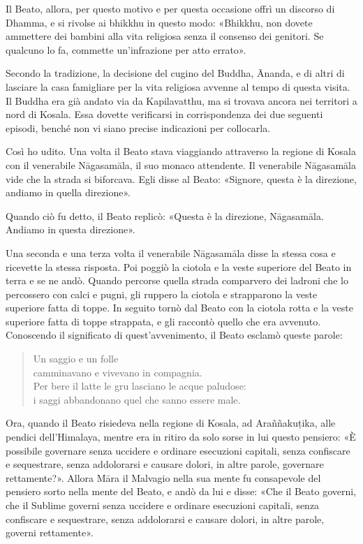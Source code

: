 Il Beato, allora, per questo motivo e per questa occasione offrì un discorso di
Dhamma, e si rivolse ai bhikkhu in questo modo: «Bhikkhu, non dovete ammettere
dei bambini alla vita religiosa senza il consenso dei genitori. Se qualcuno lo
fa, commette un’infrazione per atto errato».


 Secondo la tradizione, la decisione del cugino del
Buddha, Ānanda, e di altri di lasciare la casa famigliare per la vita religiosa
avvenne al tempo di questa visita. Il Buddha era già andato via da Kapilavatthu,
ma si trovava ancora nei territori a nord di Kosala. Essa dovette verificarsi in
corrispondenza dei due seguenti episodi, benché non vi siano precise indicazioni
per collocarla.

 Così ho udito. Una volta il Beato stava viaggiando
attraverso la regione di Kosala con il venerabile Nāgasamāla, il suo monaco
attendente. Il venerabile Nāgasamāla vide che la strada si biforcava. Egli disse
al Beato: «Signore, questa è la direzione, andiamo in quella direzione».

Quando ciò fu detto, il Beato replicò: «Questa è la direzione, Nāgasamāla.
Andiamo in questa direzione».

Una seconda e una terza volta il venerabile Nāgasamāla disse la stessa cosa e
ricevette la stessa risposta. Poi poggiò la ciotola e la veste superiore del
Beato in terra e se ne andò. Quando percorse quella strada comparvero dei
ladroni che lo percossero con calci e pugni, gli ruppero la ciotola e
strapparono la veste superiore fatta di toppe. In seguito tornò dal Beato con la
ciotola rotta e la veste superiore fatta di toppe strappata, e gli raccontò
quello che era avvenuto. Conoscendo il significato di quest’avvenimento, il
Beato esclamò queste parole:

\begin{quote}
Un saggio e un folle \\
camminavano e vivevano in compagnia. \\
Per bere il latte le gru lasciano le acque paludose: \\
i saggi abbandonano quel che sanno essere male.
\end{quote}


Ora, quando il Beato risiedeva nella regione di Kosala, ad Araññakuṭika, alle
pendici dell’Himalaya, mentre era in ritiro da solo sorse in lui questo
pensiero: «È possibile governare senza uccidere e ordinare esecuzioni capitali,
senza confiscare e sequestrare, senza addolorarsi e causare dolori, in altre
parole, governare rettamente?». Allora Māra il Malvagio nella sua mente fu
consapevole del pensiero sorto nella mente del Beato, e andò da lui e disse:
«Che il Beato governi, che il Sublime governi senza uccidere e ordinare
esecuzioni capitali, senza confiscare e sequestrare, senza addolorarsi e causare
dolori, in altre parole, governi rettamente».


